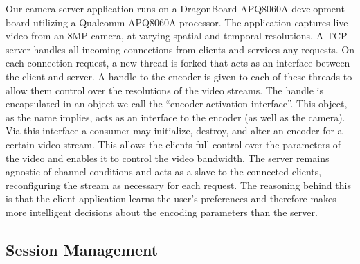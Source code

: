 \documentclass[preprint, 12pt]{elsarticle}
\begin{document}
Our camera server application runs on a DragonBoard APQ8060A development board utilizing a Qualcomm APQ8060A processor. The application captures live video from an 8MP camera, at varying spatial and temporal resolutions. A TCP server handles all incoming connections from clients and services any requests. On each connection request, a new thread is forked that acts as an interface between the client and server. A handle to the encoder is given to each of these threads to allow them control over the resolutions of the video streams. The handle is encapsulated in an object we call the ``encoder activation interface''. This object, as the name implies, acts as an interface to the encoder (as well as the camera). Via this interface a consumer may initialize, destroy, and alter an encoder for a certain video stream. This allows the clients full control over the parameters of the video and enables it to control the video bandwidth. The server remains agnostic of channel conditions and acts as a slave to the connected clients, reconfiguring the stream as necessary for each request. The reasoning behind this is that the client application learns the user’s preferences and therefore makes more intelligent decisions about the encoding parameters than the server.

\subsection{Session Management}
\end{document}
